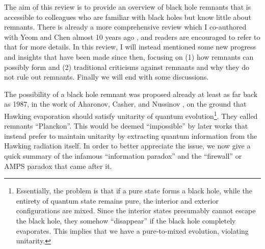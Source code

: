 \documentclass[preprintnumbers, floatfix, preprintnumbers, letterpaper, twocolumn, superscriptaddress,nofootinbib]{revtex4-2}
\begin{document}
The aim of this review is to provide an overview of black hole remnants that is accessible to colleagues who are familiar with black holes but know little about remnants. There is already a more comprehensive review which I co-authored with Yeom and Chen almost 10 years ago \cite{1412.8366}, and readers are encouraged to refer to that for more details. In this review, I will instead mentioned some new progress and insights that have been made since then, focusing on (1) how remnants can possibly form and (2) traditional criticisms against remnants and why they do not rule out remnants. Finally we will end with some discussions. 

The possibility of a black hole remnant was proposed already at least as far back as 1987, in the work of Aharonov, Casher, and Nussinov \cite{ACN}, on the ground that Hawking evaporation should satisfy unitarity of quantum evolution\footnote{Essentially, the problem is that if a pure state forms a black hole, while the entirety of quantum state remains pure, the interior and exterior configurations are mixed. Since the interior states presumably cannot escape the black hole, they somehow ``disappear'' if the black hole completely evaporates. This implies that we have a pure-to-mixed evolution, violating unitarity.}. They called remnants ``Planckon''. This would be deemed ``impossible'' by later works that instead prefer to maintain unitarity by extracting quantum information from the Hawking radiation itself. In order to better appreciate the issue, we now give a quick summary of the infamous ``information paradox'' and the ``firewall'' or AMPS paradox \cite{1207.3123,1304.6483} that came after it.
\end{document}
